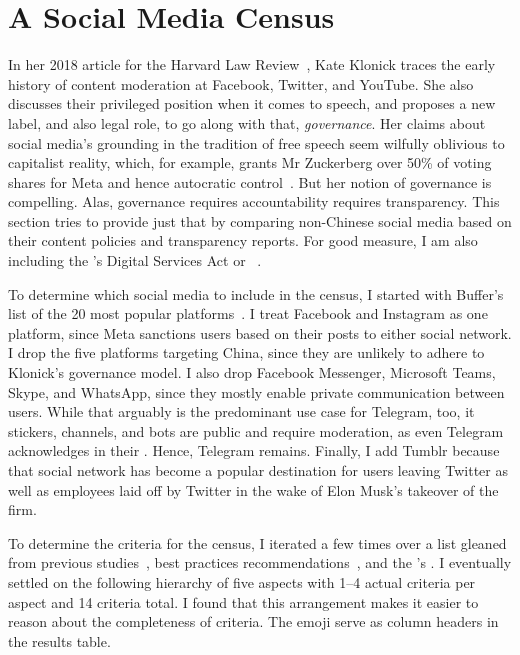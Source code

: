 \section{A Social Media Census}
\label{sec:census}

In her 2018 article for the Harvard Law Review~\cite{Klonick2018}, Kate Klonick
traces the early history of content moderation at Facebook, Twitter, and
YouTube. She also discusses their privileged position when it comes to speech,
and proposes a new label, and also legal role, to go along with that,
\emph{governance}. Her claims about social media's grounding in the tradition of
free speech seem wilfully oblivious to capitalist reality, which, for example,
grants Mr Zuckerberg over 50\% of voting shares for Meta and hence autocratic
control~\cite{LauricellaNorton2021}. But her notion of governance is compelling.
Alas, governance requires accountability requires transparency. This section
tries to provide just that by comparing non-Chinese social media based on their
content policies and transparency reports. For good measure, I am also including
the \EU's Digital Services Act or \DSA~\cite{EuropeanParliamentAndCouncil2022}.

To determine which social media to include in the census, I started with
Buffer's list of the 20 most popular platforms~\cite{Lua2022}. I treat Facebook
and Instagram as one platform, since Meta sanctions users based on their posts
to either social network. I drop the five platforms targeting China, since they
are unlikely to adhere to Klonick's governance model. I also drop Facebook
Messenger, Microsoft Teams, Skype, and WhatsApp, since they mostly enable
private communication between users. While that arguably is the predominant use
case for Telegram, too, it stickers, channels, and bots are public and require
moderation, as even Telegram acknowledges in their \FAQ. Hence, Telegram
remains. Finally, I add Tumblr because that social network has become a popular
destination for users leaving Twitter as well as employees laid off by Twitter
in the wake of Elon Musk's takeover of the firm.

To determine the criteria for the census, I iterated a few times over a list
gleaned from previous studies~\cite{BradfordGriselea2019,CrockerGebhartea2019},
best practices
recommendations~\cite{AccessNowACLUFoundationOfNorthernCaliforniaea2021}, and
the \EU's \DSA. I eventually settled on the following hierarchy of five aspects
with 1--4 actual criteria per aspect and 14 criteria total. I found that this
arrangement makes it easier to reason about the completeness of criteria. The
emoji serve as column headers in the results table.

